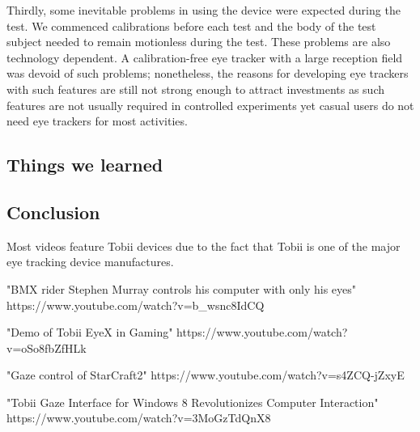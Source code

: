 \documentclass[english]{tktltiki}
\begin{document}
Thirdly, some inevitable problems in using the device were expected during the test. We commenced calibrations before each test and the body of the test subject needed to remain motionless during the test. These problems are also technology dependent. A calibration-free eye tracker with a large reception field was devoid of such problems; nonetheless,  the reasons for developing eye trackers with such features are still not strong enough to attract investments as such features are not usually required in controlled experiments yet casual users do not need eye trackers for most activities.


\subsection{Things we learned}



\subsection{Conclusion}












\lastpage

\appendices

\pagestyle{empty}


Most videos feature Tobii devices due to the fact that Tobii is one of the major eye tracking device manufactures.

"BMX rider Stephen Murray controls his computer with only his eyes"
https://www.youtube.com/watch?v=b\_wsnc8IdCQ

"Demo of Tobii EyeX in Gaming"
https://www.youtube.com/watch?v=oSo8fbZfHLk

"Gaze control of StarCraft2"
https://www.youtube.com/watch?v=s4ZCQ-jZxyE

"Tobii Gaze Interface for Windows 8 Revolutionizes Computer Interaction"
https://www.youtube.com/watch?v=3MoGzTdQnX8
\end{document}
